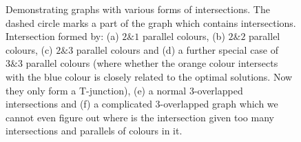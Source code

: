 \documentclass[conference]{IEEEtran}
\begin{document}
\begin{figure}[t]
\centering
\caption{Demonstrating graphs with various forms of intersections. 
The dashed circle marks a part of the graph which contains intersections. 
Intersection formed by: (a) $2\&1$ parallel colours, (b) $2\&2$ parallel colours, (c) $2\&3$ parallel colours and (d) a further special case of $3\&3$ parallel colours (where whether the orange colour intersects with the blue colour is closely related to the optimal solutions. Now they only form a T-junction), (e) a normal $3$-overlapped intersections and (f) a complicated $3$-overlapped graph which we cannot even figure out where is the intersection given too many intersections and parallels of colours in it. }\label{fig:three_overlapped_graph}
\end{figure}

\end{document}
